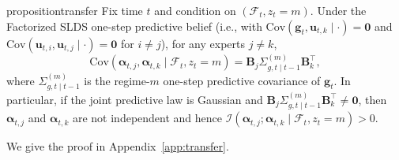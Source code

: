 \begin{restatable}{proposition}{transfer}
\label{prop:transfer}
Fix time \(t\) and condition on \((\mathcal{F}_t,z_t=m)\). Under the Factorized SLDS one-step predictive
belief (i.e., with \(\mathrm{Cov}(\mathbf{g}_t,\mathbf{u}_{t,k}\mid\cdot)=\mathbf{0}\) and
\(\mathrm{Cov}(\mathbf{u}_{t,i},\mathbf{u}_{t,j}\mid\cdot)=\mathbf{0}\) for \(i\neq j\)), for any experts \(j\neq k\),
\[
\mathrm{Cov}\left(\boldsymbol\alpha_{t,j},\boldsymbol\alpha_{t,k}\mid \mathcal{F}_t,z_t=m\right)
=
\mathbf{B}_j\Sigma^{(m)}_{g,t\mid t-1}\mathbf{B}_k^\top,
\]
where \(\Sigma^{(m)}_{g,t\mid t-1}\) is the regime-\(m\) one-step predictive covariance of \(\mathbf{g}_t\).
In particular, if the joint predictive law is Gaussian and
\(\mathbf{B}_j\Sigma^{(m)}_{g,t\mid t-1}\mathbf{B}_k^\top\neq \mathbf{0}\),
then \(\boldsymbol\alpha_{t,j}\) and \(\boldsymbol\alpha_{t,k}\) are not independent and hence
\(\mathcal{I}(\boldsymbol\alpha_{t,j};\boldsymbol\alpha_{t,k}\mid \mathcal{F}_t,z_t=m)>0\).
\end{restatable}

We give the proof in Appendix~\ref{app:transfer}.
